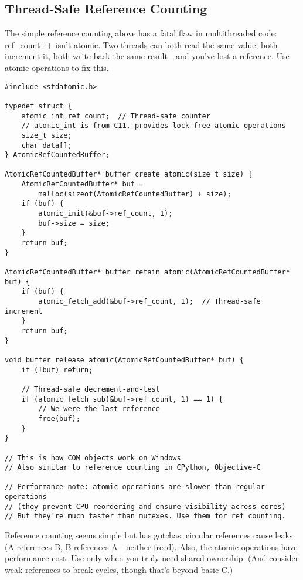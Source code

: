 \subsection{Thread-Safe Reference Counting}

The simple reference counting above has a fatal flaw in multithreaded code: ref\_count++ isn't atomic. Two threads can both read the same value, both increment it, both write back the same result—and you've lost a reference. Use atomic operations to fix this.

\begin{lstlisting}
#include <stdatomic.h>

typedef struct {
    atomic_int ref_count;  // Thread-safe counter
    // atomic_int is from C11, provides lock-free atomic operations
    size_t size;
    char data[];
} AtomicRefCountedBuffer;

AtomicRefCountedBuffer* buffer_create_atomic(size_t size) {
    AtomicRefCountedBuffer* buf =
        malloc(sizeof(AtomicRefCountedBuffer) + size);
    if (buf) {
        atomic_init(&buf->ref_count, 1);
        buf->size = size;
    }
    return buf;
}

AtomicRefCountedBuffer* buffer_retain_atomic(AtomicRefCountedBuffer* buf) {
    if (buf) {
        atomic_fetch_add(&buf->ref_count, 1);  // Thread-safe increment
    }
    return buf;
}

void buffer_release_atomic(AtomicRefCountedBuffer* buf) {
    if (!buf) return;

    // Thread-safe decrement-and-test
    if (atomic_fetch_sub(&buf->ref_count, 1) == 1) {
        // We were the last reference
        free(buf);
    }
}

// This is how COM objects work on Windows
// Also similar to reference counting in CPython, Objective-C

// Performance note: atomic operations are slower than regular operations
// (they prevent CPU reordering and ensure visibility across cores)
// But they're much faster than mutexes. Use them for ref counting.
\end{lstlisting}

\begin{warningbox}
Reference counting seems simple but has gotchas: circular references cause leaks (A references B, B references A—neither freed). Also, the atomic operations have performance cost. Use only when you truly need shared ownership. (And consider weak references to break cycles, though that's beyond basic C.)
\end{warningbox}

